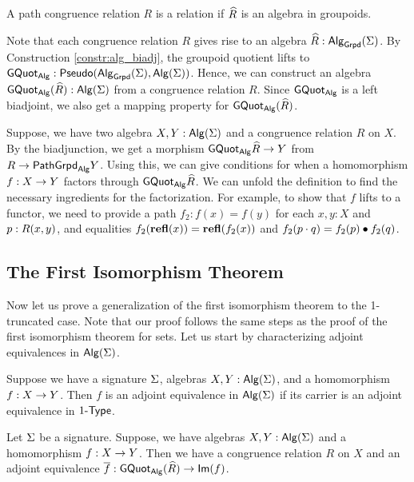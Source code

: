 \begin{definition}
A path congruence relation $R$ is a  relation if $\widehat{R}$ is an algebra in groupoids.
\end{definition}

Note that each congruence relation $R$ gives rise to an algebra $\widehat{R} : \mathsf{Alg}_{\mathsf{Grpd}}(\Sigma)$.
By Construction \ref{constr:alg_biadj}, the groupoid quotient lifts to $\mathsf{GQuot}_{\mathsf{Alg}} : \mathsf{Pseudo}(\mathsf{Alg}_{\mathsf{Grpd}}(\Sigma), \mathsf{Alg}(\Sigma))$.
Hence, we can construct an algebra $\mathsf{GQuot}_{\mathsf{Alg}}(\widehat{R}) : \mathsf{Alg}(\Sigma)$ from a congruence relation $R$.
Since $\mathsf{GQuot}_{\mathsf{Alg}}$ is a left biadjoint, we also get a mapping property for $\mathsf{GQuot}_{\mathsf{Alg}}(\widehat{R})$.

\begin{remark}
\label{remark:mapping_property_congruence}
Suppose, we have two algebra $X, Y : \mathsf{Alg}(\Sigma)$ and a congruence relation $R$ on $X$.
By the biadjunction, we get a morphism $\mathsf{GQuot}_{\mathsf{Alg}}{\widehat{R}} \rightarrow Y$ from $R \rightarrow \mathsf{PathGrpd}_{\mathsf{Alg}}{Y}$.
Using this, we can give conditions for when a homomorphism $f : X \rightarrow Y$ factors through $\mathsf{GQuot}_{\mathsf{Alg}}{\widehat{R}}$.
We can unfold the definition to find the necessary ingredients for the factorization.
For example, to show that $f$ lifts to a functor, we need to provide a path $f_2 : f(x) = f(y)$ for each $x, y : X$ and $p : R(x, y)$, and equalities $f_2(\operatorname{\mathbf{refl}}(x)) =\operatorname{\mathbf{refl}}(f_2(x))$ and $f_2(p \cdot q) = f_2(p) \bullet f_2(q)$.
\end{remark}

\subsection{The First Isomorphism Theorem}
Now let us prove a generalization of the first isomorphism theorem to the 1-truncated case.
Note that our proof follows the same steps as the proof of the first isomorphism theorem for sets.
Let us start by characterizing adjoint equivalences in $\mathsf{Alg}(\Sigma)$.

\begin{proposition}
\label{prop:algebra_adjequiv}
Suppose we have a signature $\Sigma$, algebras $X, Y : \mathsf{Alg}(\Sigma)$, and a homomorphism $f : X \rightarrow Y$.
Then $f$ is an adjoint equivalence in $\mathsf{Alg}(\Sigma)$ if its carrier is an adjoint equivalence in $1\mbox{-}\mathsf{Type}$.
\end{proposition}

\begin{theorem}\label{thm:iso_thm}
Let $\Sigma$ be a signature.
Suppose, we have algebras $X, Y : \mathsf{Alg}(\Sigma)$ and a homomorphism $f : X \rightarrow Y$.
Then we have a congruence relation $R$ on $X$ and an adjoint equivalence $\overline{f} : \mathsf{GQuot}_{\mathsf{Alg}}(\widehat{R}) \rightarrow \mathsf{Im}(f)$.
\end{theorem}

